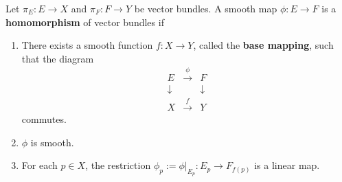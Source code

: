 Let $\pi_E: E \to X$ and $\pi_F: F \to Y$ be vector bundles. A smooth map $\phi: E \to F$ is a \textbf{homomorphism} of vector bundles if

\begin{enumerate}
\item[(1)] There exists a smooth function $f: X \to Y$, called the \textbf{base mapping}, such that the diagram
\[
\begin{array}{ccc}
E & \xrightarrow{\phi} & F \\
\downarrow & & \downarrow \\
X & \xrightarrow{f} & Y
\end{array}
\]
commutes.
\item[(2)] $\phi$ is smooth.
\item[(3)] For each $p \in X$, the restriction $\phi_p := \phi|_{E_p}: E_p \to F_{f(p)}$ is a linear map.
\end{enumerate}
